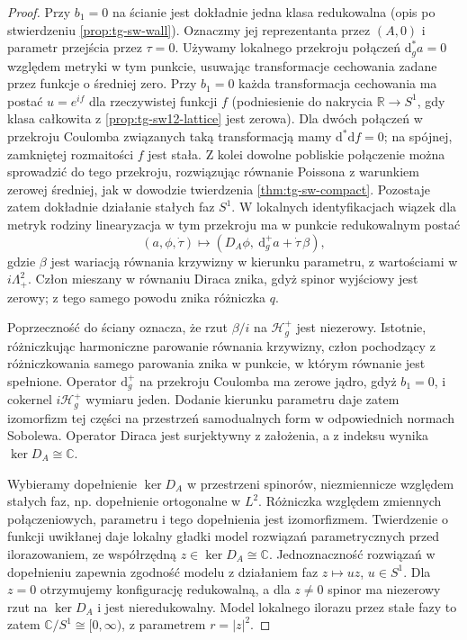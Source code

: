 \begin{proof}
Przy $b_1=0$ na ścianie jest dokładnie jedna
klasa redukowalna (opis po stwierdzeniu
\ref{prop:tg-sw-wall}). Oznaczmy jej reprezentanta
przez $(A,0)$ i parametr przejścia przez $\tau=0$.
Używamy lokalnego przekroju połączeń
$\mathrm d_g^*a=0$ względem metryki w tym punkcie,
usuwając transformacje cechowania zadane
przez funkcje o średniej zero.
Przy $b_1=0$ każda transformacja cechowania
ma postać $u=e^{if}$ dla rzeczywistej funkcji $f$
(podniesienie do nakrycia $\mathbb R\to S^1$,
gdy klasa całkowita z
\ref{prop:tg-sw12-lattice} jest zerowa).
Dla dwóch połączeń w przekroju Coulomba
związanych taką transformacją mamy
$\mathrm d^*\mathrm df=0$; na spójnej,
zamkniętej rozmaitości $f$ jest stała.
Z kolei dowolne pobliskie połączenie można
sprowadzić do tego przekroju, rozwiązując
równanie Poissona z warunkiem zerowej średniej,
jak w dowodzie twierdzenia
\ref{thm:tg-sw-compact}.
Pozostaje zatem dokładnie działanie
stałych faz $S^1$.
W lokalnych identyfikacjach wiązek dla metryk
rodziny linearyzacja w tym przekroju ma w
punkcie redukowalnym postać
\[
(a,\phi,\dot\tau)\longmapsto
(D_A\phi,\ \mathrm d_g^+a+\dot\tau\,\beta),
\]
gdzie $\beta$ jest wariacją równania krzywizny
w kierunku parametru, z wartościami w
$i\Lambda^2_+$. Człon mieszany w równaniu
Diraca znika, gdyż spinor wyjściowy jest zerowy;
z tego samego powodu znika różniczka $q$.

Poprzeczność do ściany oznacza, że rzut
$\beta/i$ na $\mathcal H_g^+$ jest niezerowy.
Istotnie, różniczkując harmoniczne parowanie
równania krzywizny, człon pochodzący
z różniczkowania samego parowania znika
w punkcie, w którym równanie jest spełnione.
Operator $\mathrm d_g^+$ na przekroju Coulomba
ma zerowe jądro, gdyż $b_1=0$,
i cokernel $i\mathcal H_g^+$ wymiaru jeden.
Dodanie kierunku parametru daje zatem
izomorfizm tej części na przestrzeń
samodualnych form w odpowiednich normach Sobolewa.
Operator Diraca jest surjektywny z założenia,
a z indeksu wynika $\ker D_A\cong\mathbb C$.

Wybieramy dopełnienie $\ker D_A$ w przestrzeni
spinorów, niezmiennicze względem stałych faz,
np. dopełnienie ortogonalne w $L^2$.
Różniczka względem zmiennych połączeniowych,
parametru i tego dopełnienia jest izomorfizmem.
Twierdzenie o funkcji uwikłanej daje lokalny
gładki model rozwiązań parametrycznych
przed ilorazowaniem, ze współrzędną
$z\in\ker D_A\cong\mathbb C$.
Jednoznaczność rozwiązań w dopełnieniu
zapewnia zgodność modelu z działaniem faz
$z\mapsto uz$, $u\in S^1$.
Dla $z=0$ otrzymujemy konfigurację redukowalną,
a dla $z\ne0$ spinor ma niezerowy rzut
na $\ker D_A$ i jest nieredukowalny.
Model lokalnego ilorazu przez stałe fazy
to zatem $\mathbb C/S^1\cong[0,\infty)$,
z parametrem $r=|z|^2$.


\end{proof}
